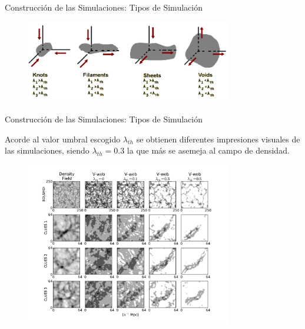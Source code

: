 \documentclass[8pt,fleqn]{beamer}
\begin{document}
\begin{frame}
\begin{block}{Construcción de las Simulaciones: Tipos de Simulación}\justifying

\begin{figure}[htbp]
	\centering
	\includegraphics[trim = 0mm 0mm 0mm 0mm, clip, width=0.8\textwidth]
	{./figures/EnvironmentClassification.png}
\end{figure}

\end{block}
\end{frame}
\begin{frame}
\begin{block}{Construcción de las Simulaciones: Tipos de Simulación}\justifying

Acorde al valor umbral escogido $\lambda_{th}$ se obtienen diferentes 
impresiones visuales de las simulaciones, siendo $\lambda_{th} = 0.3$ la
que más se asemeja al campo de densidad.

\begin{figure}[htbp]
	\centering
	\includegraphics[trim = 0mm 10mm 0mm 10mm, clip, width=0.8\textwidth]
	{./figures/Vweb_Comparison.pdf}
\end{figure}

\end{block}
\end{frame}
\end{document}
